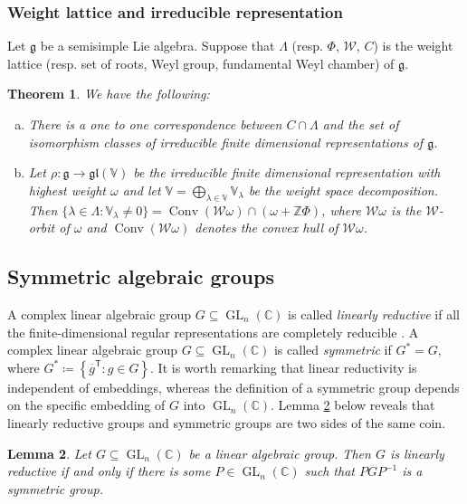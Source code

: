 \documentclass[11pt,reqno]{amsart}
\DeclareMathOperator{\GL}{GL}
\DeclareMathOperator{\Conv}{Conv}
\newtheorem{theorem}{Theorem}[section]
\newtheorem{lemma}[theorem]{Lemma}
\newcommand{\ZZ}{\mathbb{Z}} %
\newcommand{\W}{\mathcal{W}}
\newcommand{\tp}{{\scriptscriptstyle\mathsf{T}}}
\begin{document}
\subsubsection{Weight lattice and irreducible representation}
Let $\mathfrak{g}$ be a semisimple Lie algebra.  Suppose that $\Lambda$ (resp.  $\Phi$,  $\W$,  $C$) is the weight lattice (resp.  set of roots,  Weyl group,  fundamental Weyl chamber) of $\mathfrak{g}$.  
\begin{theorem}\cite[Theorem 14.18]{fulton2013representation}\label{thm: FTRTSLA}
We have the following:
\begin{enumerate}[(a)]
\item There is a one to one correspondence between $C \cap \Lambda$ and the set of isomorphism classes of irreducible finite dimensional representations of $\mathfrak{g}$.  

\item Let $\rho: \mathfrak{g} \to \mathfrak{gl}(\mathbb{V})$ be the irreducible finite dimensional representation with highest weight $\omega$ and let $\mathbb{V} = \bigoplus_{\lambda \in \mathbb{V}} \mathbb{V}_{\lambda}$ be the weight space decomposition.  Then
$\{\lambda \in \Lambda: \mathbb{V}_{\lambda} \ne 0 \} = \Conv(\W \omega) \cap \left( \omega + \ZZ\Phi \right)$,  where $\W \omega$ is the $\W$-orbit of $\omega$ and $\Conv(\W \omega)$ denotes the convex hull of $\W \omega$. 
\end{enumerate}
\end{theorem}  
\subsection{Symmetric algebraic groups}
A complex linear algebraic group $G \subseteq \GL_n(\mathbb{C})$ is called \emph{linearly reductive} \cite[Section 3.1.3]{wallach2017geometric} if all the finite-dimensional regular representations are completely reducible . A complex linear algebraic group $G \subseteq \GL_n(\mathbb{C})$ is called \emph{symmetric}  \cite[Section 3.1.3]{wallach2017geometric}  if $G^\ast =G$, where $G^\ast \coloneqq \left\{\overline{g}^\tp: g \in G \right\}$. It is worth remarking that linear reductivity is independent of embeddings,  whereas the definition of a symmetric group depends on the specific embedding of $G$ into $\GL_n(\mathbb{C})$.   Lemma \ref{lem: linear reductive sym} below reveals that linearly reductive groups and symmetric groups are two sides of the same coin.

\begin{lemma}\label{lem: linear reductive sym}\cite[Lemma 3.5, Theorem 3.13]{wallach2017geometric}
Let $G \subseteq \GL_n(\mathbb{C})$ be a  linear algebraic group.  Then $G$ is linearly reductive if and only if there is some $P \in \GL_n(\mathbb{C})$ such that $P G P^{-1}$ is a  symmetric group.  
\end{lemma}
\end{document}
